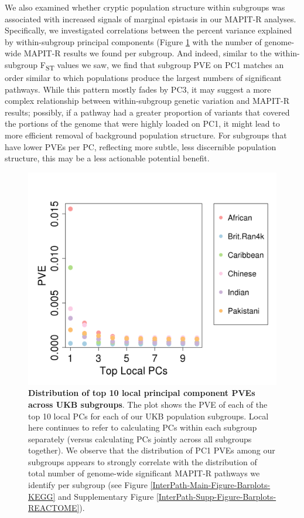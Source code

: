 \documentclass[12pt,a4paper]{article}
\begin{document}
We also examined whether cryptic population structure within subgroups was associated with increased signals of marginal epistasis in our MAPIT-R analyses. Specifically, we investigated correlations between the percent variance explained by within-subgroup principal components (Figure \ref{InterPath-Main-Figure-Eigenvalues} with the number of genome-wide MAPIT-R results we found per subgroup. And indeed, similar to the within-subgroup F\textsubscript{ST} values we saw, we find that subgroup PVE on PC1 matches an order similar to which populations produce the largest numbers of significant pathways. While this pattern mostly fades by PC3, it may suggest a more complex relationship between within-subgroup genetic variation and MAPIT-R results; possibly, if a pathway had a greater proportion of variants that covered the portions of the genome that were highly loaded on PC1, it might lead to more efficient removal of background population structure. For subgroups that have lower PVEs per PC, reflecting more subtle, less discernible population structure, this may be a less actionable potential benefit.

\begin{figure}[htb]
\centering
\includegraphics[scale=.45]{Images/Main/InterPath_Main_Figure_Eigenvalues_vs2.png}
\caption[TBD]{\textbf{Distribution of top 10 local principal component PVEs across UKB subgroups}. The plot shows the PVE of each of the top 10 local PCs for each of our UKB population subgroups. Local here continues to refer to calculating PCs within each subgroup separately (versus calculating PCs jointly across all subgroups together). We observe that the distribution of PC1 PVEs among our subgroups appears to strongly correlate with the distribution of total number of genome-wide significant MAPIT-R pathways we identify per subgroup (see Figure \ref{InterPath-Main-Figure-Barplots-KEGG} and  Supplementary Figure \ref{InterPath-Supp-Figure-Barplots-REACTOME}).}
\label{InterPath-Main-Figure-Eigenvalues}
\end{figure}
\end{document}
